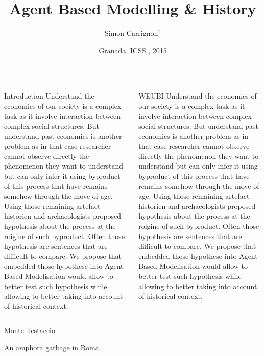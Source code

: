 \documentclass[final]{beamer}
\title{
	Agent Based Modelling  \& History
}
\date{Granada, ICSS , 2015}
\author{Simon Carrignon$^1$}
\institute[]{
	$^1$Barcelona~Supercomputing~Center \\

}
\begin{document}
\begin{frame}
	\maketitle
	\begin{columns}
		\begin{block}{Introduction}
			Understand the economics of our society is a complex task as it involve interaction between complex social structures. But understand past economics is another problem as in that case researcher cannot observe directly the phenomenon they want to understand but can only infer it using byproduct of this process that have remains somehow through the move of age. Using those remaining artefact historien and archaeologists proposed hypothesis about the process at the roigine of such byproduct. Often those hypothesis are sentences that are difficult to compare. We propose that embedded those hypothese into Agent Based Modelisation would allow to better test such hypothesis while allowing to better taking into account of historical context.
		\end{block}

		\begin{block}{WEUBI}
			Understand the economics of our society is a complex task as it involve interaction between complex social structures. But understand past economics is another problem as in that case researcher cannot observe directly the phenomenon they want to understand but can only infer it using byproduct of this process that have remains somehow through the move of age. Using those remaining artefact historien and archaeologists proposed hypothesis about the process at the roigine of such byproduct. Often those hypothesis are sentences that are difficult to compare. We propose that embedded those hypothese into Agent Based Modelisation would allow to better test such hypothesis while allowing to better taking into account of historical context.
		\end{block}
	\end{columns}
	\begin{columns}
		\column{0.33\textwidth}
	\begin{block}
		{Monte Testaccio}

		An amphora garbage in Roma.\\


\end{block}
\end{columns}
\end{frame}
\end{document}
